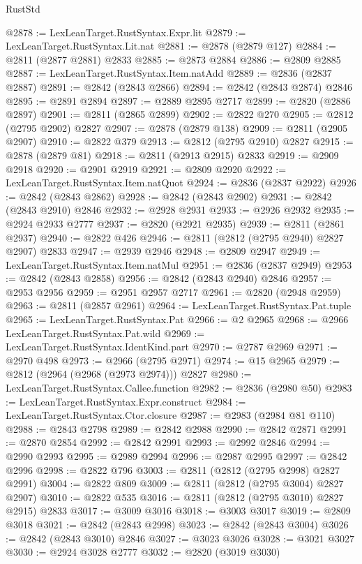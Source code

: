 \begin{lexlean}{RustStd}
\begin{coremodule}
{\begin{coremodule}
{{{{{{{{{{{{{{{{{{{{{{{{{{{{{{{{{@2878 := LexLeanTarget.RustSyntax.Expr.lit
@2879 := LexLeanTarget.RustSyntax.Lit.nat
@2881 := @2878 (@2879 @127)
@2884 := @2811 (@2877 @2881) @2833
@2885 := @2873 @2884
@2886 := @2809 @2885
@2887 := LexLeanTarget.RustSyntax.Item.natAdd
@2889 := @2836 (@2837 @2887)
@2891 := @2842 (@2843 @2866)
@2894 := @2842 (@2843 @2874) @2846
@2895 := @2891 @2894
@2897 := @2889 @2895 @2717
@2899 := @2820 (@2886 @2897)
@2901 := @2811 (@2865 @2899)
@2902 := @2822 @270
@2905 := @2812 (@2795 @2902) @2827
@2907 := @2878 (@2879 @138)
@2909 := @2811 (@2905 @2907)
@2910 := @2822 @379
@2913 := @2812 (@2795 @2910) @2827
@2915 := @2878 (@2879 @81)
@2918 := @2811 (@2913 @2915) @2833
@2919 := @2909 @2918
@2920 := @2901 @2919
@2921 := @2809 @2920
@2922 := LexLeanTarget.RustSyntax.Item.natQuot
@2924 := @2836 (@2837 @2922)
@2926 := @2842 (@2843 @2862)
@2928 := @2842 (@2843 @2902)
@2931 := @2842 (@2843 @2910) @2846
@2932 := @2928 @2931
@2933 := @2926 @2932
@2935 := @2924 @2933 @2777
@2937 := @2820 (@2921 @2935)
@2939 := @2811 (@2861 @2937)
@2940 := @2822 @426
@2946 := @2811 (@2812 (@2795 @2940) @2827 @2907) @2833
@2947 := @2939 @2946
@2948 := @2809 @2947
@2949 := LexLeanTarget.RustSyntax.Item.natMul
@2951 := @2836 (@2837 @2949)
@2953 := @2842 (@2843 @2858)
@2956 := @2842 (@2843 @2940) @2846
@2957 := @2953 @2956
@2959 := @2951 @2957 @2717
@2961 := @2820 (@2948 @2959)
@2963 := @2811 (@2857 @2961)
@2964 := LexLeanTarget.RustSyntax.Pat.tuple
@2965 := LexLeanTarget.RustSyntax.Pat
@2966 := @2 @2965
@2968 := @2966 LexLeanTarget.RustSyntax.Pat.wild
@2969 := LexLeanTarget.RustSyntax.IdentKind.part
@2970 := @2787 @2969
@2971 := @2970 @498
@2973 := @2966 (@2795 @2971)
@2974 := @15 @2965
@2979 := @2812 (@2964 (@2968 (@2973 @2974))) @2827
@2980 := LexLeanTarget.RustSyntax.Callee.function
@2982 := @2836 (@2980 @50)
@2983 := LexLeanTarget.RustSyntax.Expr.construct
@2984 := LexLeanTarget.RustSyntax.Ctor.closure
@2987 := @2983 (@2984 @81 @110)
@2988 := @2843 @2798
@2989 := @2842 @2988
@2990 := @2842 @2871
@2991 := @2870 @2854
@2992 := @2842 @2991
@2993 := @2992 @2846
@2994 := @2990 @2993
@2995 := @2989 @2994
@2996 := @2987 @2995
@2997 := @2842 @2996
@2998 := @2822 @796
@3003 := @2811 (@2812 (@2795 @2998) @2827 @2991)
@3004 := @2822 @809
@3009 := @2811 (@2812 (@2795 @3004) @2827 @2907)
@3010 := @2822 @535
@3016 := @2811 (@2812 (@2795 @3010) @2827 @2915) @2833
@3017 := @3009 @3016
@3018 := @3003 @3017
@3019 := @2809 @3018
@3021 := @2842 (@2843 @2998)
@3023 := @2842 (@2843 @3004)
@3026 := @2842 (@2843 @3010) @2846
@3027 := @3023 @3026
@3028 := @3021 @3027
@3030 := @2924 @3028 @2777
@3032 := @2820 (@3019 @3030)
}}}}}}}}}}}}}}}}}}}}}}}}}}}}}}}}}
\end{coremodule}}
\end{coremodule}
\end{lexlean}
